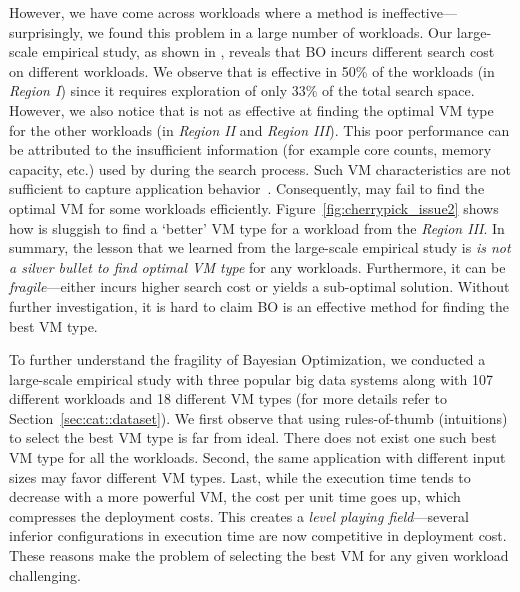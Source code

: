 However, we have come across workloads where a \bo method is ineffective---surprisingly,
we found this problem in a large number of workloads.
Our large-scale empirical study, as shown in \myfigure{~\ref{fig:cherrypick_issue1}},
reveals that BO incurs different search cost on different workloads.
We observe that \bo is effective in 50\% of the workloads (in \emph{Region I}) since it requires exploration of only
33\% of the total search space.
However, we also notice that \bo is not as effective at finding the optimal VM type
for the other workloads (in \emph{Region II} and \emph{Region III}).
This poor performance can be attributed to
the insufficient information (for example core counts, memory capacity, etc.) used by \bo during the search process.
Such VM characteristics are not sufficient to capture application behavior~\cite{Hsu2016, Yadwadkar2017, Dalibard2017}.
Consequently, \bo may fail to find the optimal VM for some workloads efficiently.
Figure~\ref{fig:cherrypick_issue2} shows
how \bo is sluggish to find a `better' VM type for a workload from the \emph{Region III}.
In summary, the lesson that we learned from the large-scale empirical study is \textit{\bo is not a silver bullet to find optimal VM type} for any workloads.
Furthermore, it can be \textit{fragile}---either incurs higher search cost or yields a sub-optimal solution.
Without further investigation, it is hard to claim BO is an effective method for finding the best VM type.


To further understand the fragility of Bayesian Optimization,
we conducted a large-scale empirical study with three popular big data systems along with 107 different workloads and 18 different VM types
(for more details refer to Section~\ref{sec:cat::dataset}).  
We first observe that using rules-of-thumb (intuitions) to select the best VM type is far from ideal.
There does not exist one such best VM type for all the workloads.
Second, the same application with different input sizes may favor different VM types.
Last,
while the execution time tends to decrease with a more powerful
VM, the cost per unit time goes up, which compresses the
deployment costs.
This creates a \textit{level playing field}---several inferior
configurations in execution time are now competitive in deployment cost.
These reasons make the problem of selecting the best VM for any given workload challenging.

